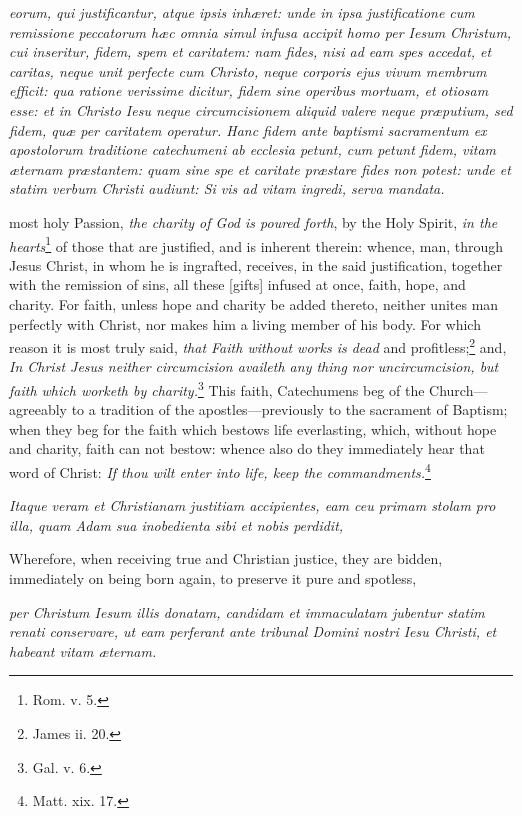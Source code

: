 \emph{eorum, qui justificantur, atque ipsis inhæret: unde in ipsa justificatione cum remissione peccatorum hæc omnia simul infusa accipit homo per Iesum Christum, cui inseritur, fidem, spem et caritatem: nam fides, nisi ad eam spes accedat, et caritas, neque unit perfecte cum Christo, neque corporis ejus vivum membrum efficit: qua ratione verissime dicitur, fidem sine operibus mortuam, et otiosam esse: et in Christo Iesu neque circumcisionem aliquid valere neque præputium, sed fidem, quæ per caritatem operatur. Hanc fidem ante baptismi sacramentum ex apostolorum traditione catechumeni ab ecclesia petunt, cum petunt fidem, vitam æternam præstantem: quam sine spe et caritate præstare fides non potest: unde et statim verbum Christi audiunt: Si vis ad vitam ingredi, serva mandata.}

most holy Passion, \emph{the charity of God is poured forth}, by the Holy Spirit, \emph{in the hearts}\footnote{\par   Rom. v. 5.} of those that are justified, and is inherent therein: whence, man, through Jesus Christ, in whom he is ingrafted, receives, in the said justification, together with the remission of sins, all these [gifts] infused at once, faith, hope, and charity. For faith, unless hope and charity be added thereto, neither unites man perfectly with Christ, nor makes him a living member of his body. For which reason it is most truly said, \emph{that Faith without works is dead} and profitless;\footnote{\par   James ii. 20.} and, \emph{In Christ Jesus neither circumcision availeth any thing nor uncircumcision, but faith which worketh by charity.}\footnote{\par   Gal. v. 6.} This faith, Catechumens beg of the Church—agreeably to a tradition of the apostles—previously to the sacrament of Baptism; when they beg for the faith which bestows life everlasting, which, without hope and charity, faith can not bestow: whence also do they immediately hear that word of Christ: \emph{If thou wilt enter into life, keep the commandments.}\footnote{\par   Matt. xix. 17.}

\emph{Itaque veram et Christianam justitiam accipientes, eam ceu primam stolam pro illa, quam Adam sua inobedienta sibi et nobis perdidit, }

Wherefore, when receiving true and Christian justice, they are bidden, immediately on being born again, to preserve it pure and spotless,

\emph{per Christum Iesum illis donatam, candidam et immaculatam jubentur statim renati conservare, ut eam perferant ante tribunal Domini nostri Iesu Christi, et habeant vitam æternam.}

